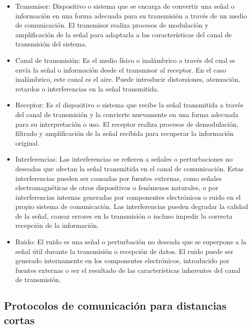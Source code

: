 \begin{itemize}
    \item Transmisor: Dispositivo o sistema que se encarga de convertir una señal o información en una forma adecuada para su transmisión a través de un medio de comunicación. El transmisor realiza procesos de modulación y amplificación de la señal para adaptarla a las características del canal de transmisión del sistema.

    \item Canal de transmisión: Es el medio físico o inalámbrico a través del cual se envía la señal o información desde el transmisor al receptor. En el caso inalámbrico, este canal es el aire. Puede introducir distorsiones, atenuación, retardos o interferencias en la señal transmitida.

    \item Receptor: Es el dispositivo o sistema que recibe la señal transmitida a través del canal de transmisión y la convierte nuevamente en una forma adecuada para su interpretación o uso. El receptor realiza procesos de demodulación, filtrado y amplificación de la señal recibida para recuperar la información original.

    \item Interferencias: Las interferencias se refieren a señales o perturbaciones no deseadas que afectan la señal transmitida en el canal de comunicación. Estas interferencias pueden ser causadas por fuentes externas, como señales electromagnéticas de otros dispositivos o fenómenos naturales, o por interferencias internas generadas por componentes electrónicos o ruido en el propio sistema de comunicación. Las interferencias pueden degradar la calidad de la señal, causar errores en la transmisión o incluso impedir la correcta recepción de la información.

    \item Ruido: El ruido es una señal o perturbación no deseada que se superpone a la señal útil durante la transmisión o recepción de datos. El ruido puede ser generado internamente en los componentes electrónicos, introducido por fuentes externas o ser el resultado de las características inherentes del canal de transmisión. 

\end{itemize}

\subsection{Protocolos de comunicación para distancias cortas}

